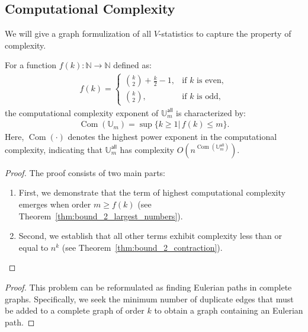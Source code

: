 \documentclass{biometrika}
\renewcommand{\_}{\raisebox{.5pt}{\underline{\phantom{x}}}}
\def\bbU{\mathbb{U}}
\newcommand{\naturals}{{\mathbb{N}}}
\begin{document}
\begin{bibunit}[biometrika]
\section{Computational Complexity}


We will give a graph formulization of all $V$-statistics to capture the property of complexity.

\begin{theorem}
\label{thm:bound_2}
    For a function $f(k): \naturals \to \naturals$ defined as:
    \begin{align}
        f(k) = 
        \begin{cases}
            \binom{k}{2} + \frac{k}{2} - 1, & \text{if } k \text{ is even}, \\
            \binom{k}{2},                    & \text{if } k \text{ is odd},
        \end{cases}
    \end{align}
    the computational complexity exponent of $\bbU_{m}^{\mathsf{all}}$ is characterized by:
    \begin{align}
        \operatorname{Com}\left( \bbU_{m} \right) = \sup\{k \geq 1| \, f(k) \leq m\}.
    \end{align}
    Here, $\operatorname{Com}\left( \cdot \right)$ denotes the highest power exponent in the computational complexity, indicating that $\bbU_{m}^{\mathsf{all}}$ has complexity $O\left(n^{\operatorname{Com}\left( \bbU_{m}^{\mathsf{all}} \right)}\right)$.
\end{theorem}

\begin{proof}
    The proof consists of two main parts:
    \begin{enumerate}
        \item First, we demonstrate that the term of highest computational complexity emerges when order $m \ge f(k)$ (see Theorem~\ref{thm:bound_2_largest_numbers}).
        \item Second, we establish that all other terms exhibit complexity less than or equal to $n^k$ (see Theorem~\ref{thm:bound_2_contraction}).
    \end{enumerate}
\end{proof}


\begin{theorem}
\label{thm:bound_2_largest_numbers}
\end{theorem}
\begin{proof}
   This problem can be reformulated as finding Eulerian paths in complete graphs. Specifically, we seek the minimum number of duplicate edges that must be added to a complete graph of order $k$ to obtain a graph containing an Eulerian path.


\end{proof}
\end{bibunit}
\end{document}
